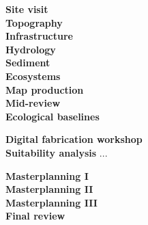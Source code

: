 \documentclass[11pt,article,oneside]{memoir}
\begin{document}
\noindent \textbf{Site visit}
\\


\noindent \textbf{Topography}
\\

\noindent \textbf{Infrastructure}
\\

\noindent \textbf{Hydrology}
\\

\noindent \textbf{Sediment}
\\

\noindent \textbf{Ecosystems}
\\

\noindent \textbf{Map production}
%
\\

\noindent \textbf{Mid-review}
\\

\noindent \textbf{Ecological baselines}
\\
%
\nocite{*} \printbibliography[keyword=baselines, heading=none]
\vspace*{0.5em}


\noindent \textbf{Digital fabrication workshop}
\\

\noindent \textbf{Suitability analysis}
...\\
%
\nocite{*} \printbibliography[keyword=suitability, heading=none]
\vspace*{0.5em}

\noindent \textbf{Masterplanning I}
\\

\noindent \textbf{Masterplanning II}
\\

\noindent \textbf{Masterplanning III}
\\

\noindent \textbf{Final review}
\\

%


\end{document}
